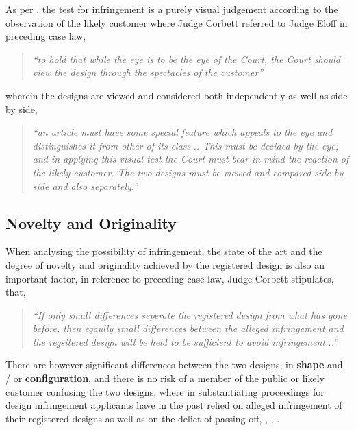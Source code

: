 \documentclass[11pt]{article}
\begin{document}
As per 
\cite{corbett84_homecraft_steel_v_sm_hare}, the test for infringement is a purely
visual judgement according to the observation of the likely customer where Judge
Corbett  referred to Judge Eloff in preceding case law,
\begin{quote}
\textit{``to hold that while the eye is to be the eye of the Court, the
Court should view the design through the spectacles of the customer''}
\end{quote}
wherein the designs are viewed and considered both independently as well as
side by side,
\begin{quote}
\textit{``an article must have some special feature which appeals to the
eye and distinguishes it from other of its class... This must be decided by the
eye; and in applying this visual test the Court must bear in mind the reaction
of the likely customer. The two designs must be viewed and compared side by side
and also separately.''}
\end{quote}

\subsection{Novelty and Originality}
\label{sec:org748e1d1}

When analysing the possibility of infringement, the state of the art and the
degree of novelty and originality achieved by the registered design is also an
important factor, in reference to preceding case law, Judge Corbett stipulates,
\cite{corbett84_homecraft_steel_v_sm_hare} that,
\begin{quote}
\textit{``If only small differences seperate the registered design from
what has gone before, then eqaully small differences between the alleged
infringement and the regsitered design will be held to be sufficient to avoid
infringement...''}
\end{quote}
There are however significant differences between the two designs, in \textbf{shape} and / or
\textbf{configuration}, and there is no risk of a member of the public or likely customer
confusing the two designs, where in substantiating proceedings for design
infringement applicants have in the past relied on alleged infringement of their
registered designs as well as on the delict of passing off,
 \cite{corbett84_homecraft_steel_v_sm_hare},
 \cite{vdwesthuizen02_slavepak_v_buddy},
\cite{duplessis02_koninklijke_phillips_v_kenwood}.\\
\end{document}
